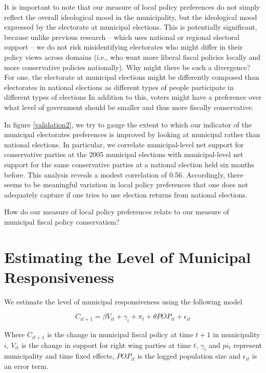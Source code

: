\documentclass[a4paper,12pt]{article}
\begin{document}
It is important to note that our measure of local policy preferences do not simply reflect the overall ideological mood in the municipality, but the ideological mood expressed by the electorate at municipal elections. This is potentially significant, because unlike previous research -- which uses national or regional electoral support --  we do not risk misidentifying electorates who might differ in their policy views across domains (i.e., who want more liberal fiscal policies locally and more conservative policies nationally). Why might there be such a divergence? For one, the electorate at municipal elections might be differently composed than electorates in national elections as different types of people participate in different types of elections \citep{ansolabehere2015beyond,hansen2017social} In addition to this, voters might have a preference over what level of government should be smaller and thus more fiscally conservative.

In figure \ref{validation2}, we try to gauge the extent to which our indicator of the municipal electorates preferences is improved by looking at municipal rather than national elections. In particular, we correlate  municipal-level  net support for conservative parties at the 2005 municipal elections with municipal-level net support for the same conservative parties at a national election held six months before. This analysis reveals a modest correlation of 0.56. Accordingly, there seems to be meaningful variation in local policy preferences that one does not adequately capture if one tries to use election returns from national elections.

How do our measure of local policy preferences relate to our measure of municipal fiscal policy conservatism? 

\section{Estimating the Level of Municipal Responsiveness}

We estimate the level of municipal responsiveness using the following model

\begin{equation}
 C_{it+1} =  \beta  V_{it} + \gamma_i +  \pi_t + \theta POP_{it}  + \epsilon_{it}
\end{equation}

Where $C_{it+1}$ is the change in municipal fiscal policy at time $t+1$ in municipality $i$, $V_{it}$ is the change in support for right wing parties at time $t$, $\gamma_i$ and $pi_t$ represent municipality and time fixed effects, $POP_{it}$ is the logged population size and $\epsilon_{it}$ is an error term.
\end{document}
